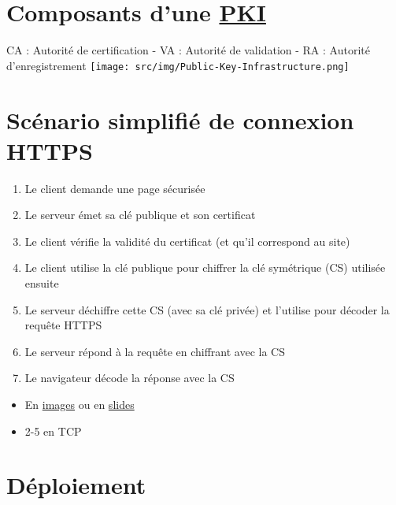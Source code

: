 \hypertarget{composants-dune-pki1}{%
\section{\texorpdfstring{Composants d'une
\href{https://en.wikipedia.org/wiki/Public_key_infrastructure}{PKI}}{Composants d'une PKI}}\label{composants-dune-pki1}}

CA : Autorité de certification - VA : Autorité de validation - RA :
Autorité d'enregistrement
\texttt{[image: src/img/Public-Key-Infrastructure.png]}

\hypertarget{scuxe9nario-simplifiuxe9-de-connexion-https}{%
\section{Scénario simplifié de connexion
HTTPS}\label{scuxe9nario-simplifiuxe9-de-connexion-https}}

\begin{enumerate}
\def\labelenumi{\arabic{enumi}.}
\tightlist
\item
  Le client demande une page sécurisée
\item
  Le serveur émet sa clé publique et son certificat
\item
  Le client vérifie la validité du certificat (et qu'il correspond au
  site)
\item
  Le client utilise la clé publique pour chiffrer la clé symétrique (CS)
  utilisée ensuite
\item
  Le serveur déchiffre cette CS (avec sa clé privée) et l'utilise pour
  décoder la requête HTTPS
\item
  Le serveur répond à la requête en chiffrant avec la CS
\item
  Le navigateur décode la réponse avec la CS
\end{enumerate}

\begin{itemize}
\tightlist
\item
  En
  \href{http://software-engineer-tips-and-tricks.blogspot.ch/2012/08/ssl-in-pictures.html?view=sidebar}{images}
  ou en \href{https://www.youtube.com/embed/iQsKdtjwtYI?rel=0}{slides}
\item
  2-5 en TCP
\end{itemize}

\hypertarget{duxe9ploiement}{%
\section{Déploiement}\label{duxe9ploiement}}

